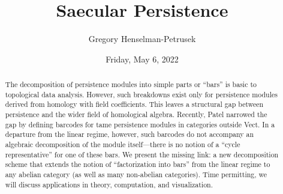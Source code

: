 \documentclass{UAmathtalk}
\author{Gregory Henselman-Petrusek}
\title{Saecular Persistence}
\date{Friday, May 6, 2022}
\begin{document}
\maketitle

\begin{abstract}
The decomposition of persistence modules into simple parts or ``bars'' is basic to topological data analysis. However, such breakdowns exist only for persistence modules derived from homology with field coefficients. This leaves a structural gap between persistence and the wider field of homological algebra. Recently, Patel narrowed the gap by defining barcodes for tame persistence modules in categories outside Vect. In a departure from the linear regime, however, such barcodes do not accompany an algebraic decomposition of the module itself---there is no notion of a ``cycle representative'' for one of these bars. We present the missing link: a new decomposition scheme that extends the notion of ``factorization into bars'' from the linear regime to any abelian category (as well as many non-abelian categories). Time permitting, we will discuss applications in theory, computation, and visualization.
\end{abstract}
\end{document}
